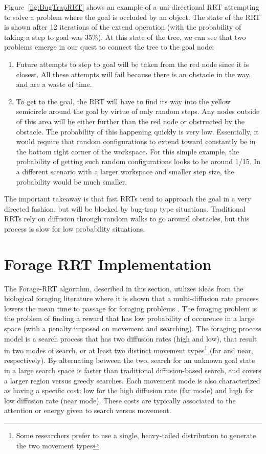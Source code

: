 \documentclass[conference]{IEEEtran}
\begin{document}
Figure~\ref{fig:BugTrapRRT} shows an example of a uni-directional RRT 
attempting to solve a problem where the goal is occluded by an object.  The
state of the RRT is shown after 12 iterations of the extend operation (with
the probability of taking a step to goal was 35\%). At this state of the
tree, we can see that two problems emerge in our quest to connect the tree 
to the goal node:
\begin{enumerate}
\item Future attempts to step to goal will be taken from the red node since it is closest. All these attempts will fail because there is an
obstacle in the way, and are a waste of time.
\item To get to the goal, the RRT will have to find its way into the yellow
semicircle around the goal by virtue of only random steps. Any nodes outside
of this area will be either further than the red node or obstructed by the
obstacle. The probability of this happening quickly is very low.
Essentially, it would require that random configurations to extend toward
constantly be in the bottom right
corner of the workspace. For this simple example, the probability of getting
such random configurations looks to be around 1/15. In a different scenario
with a larger workspace and smaller step size, the probability would be
much smaller. 
\end{enumerate}

The important takeaway is that fast RRTs tend to approach the goal in a very 
directed fashion, but will be blocked by bug-trap type situations.  
Traditional RRTs rely on diffusion through random walks to go around
obstacles, but this process is slow for low probability situations.

\section{Forage RRT Implementation}
\label{sec:implementation}

The Forage-RRT algorithm, described in this section, utilizes ideas
from the biological foraging literature where it is shown that a
multi-diffusion rate process lowers the mean time to passage for foraging
problems \CITE.  The foraging problem is the problem of finding a reward
that has low probability of occurence in a large space (with a penalty
imposed on
movement and searching).  The foraging process model is a search process
that has two diffusion rates (high and low), that result in two modes of
search, or at least two distinct movement types\footnote{Some researchers
prefer to use a single, heavy-tailed distribution to generate the two
movement types \CITE} (far and near, respectively).  By alternating between
the two, search for an unknown goal state in a large search space is faster
than traditional diffusion-based search, and covers a larger region versus
greedy searches.  Each movement mode is also characterized as having a
specific cost: low for the high diffusion rate (far mode) and high for low
diffusion rate (near mode).  These costs are typically associated to the
attention or energy given to search versus movement. 
\end{document}
